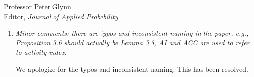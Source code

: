 \documentclass[11pt]{letter} %
\begin{document}
\begin{letter}{Professor
	Peter Glynn\\
	Editor, {\em Journal of Applied Probability}}
\begin{enumerate}
\item {\it Minor comments: there are typos and inconsistent naming in the paper, e.g., Proposition 3.6 should actually be Lemma 3.6, AI and ACC are used to refer to activity index.}

\vspace{5mm}
We apologize for the typos and inconsistent naming.  This has been resolved.
\vspace{5mm}

\end{enumerate}


\end{letter}
\end{document}
